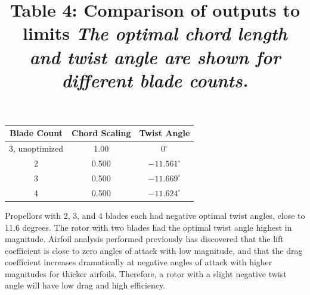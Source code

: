 \documentclass{article}
\begin{document}
\centering
\title{Table 4: Comparison of outputs to limits \newline}
\title{\emph{The optimal chord length and twist angle are shown for different blade counts.}} \label{table:3} \newline
\begin{tabular}{| c | c | c |}
	 \hline
	 \textbf{Blade Count} & \textbf{Chord Scaling} & \textbf{Twist Angle} \\ \hline
	 3, unoptimized & 1.00 & $0^{\circ}$ \\
	 2 & 0.500 & $-11.561^{\circ}$ \\
	 3 & 0.500 & $-11.669^{\circ}$ \\
	 4 & 0.500 & $-11.624^{\circ}$ \\ \hline
\end{tabular} \break \newline

\raggedright
Propellors with 2, 3, and 4 blades each had negative optimal twist angles, close to 11.6 degrees. The rotor with two blades had the optimal twist angle highest in magnitude. Airfoil analysis performed previously has discovered that the lift coefficient is close to zero angles of attack with low magnitude, and that the drag coefficient increases dramatically at negative angles of attack with higher magnitudes for thicker airfoils. Therefore, a rotor with a slight negative twist angle will have low drag and high efficiency. \newline
\end{document}
